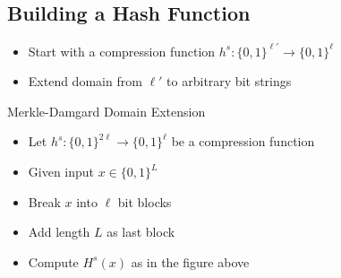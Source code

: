 \subsection*{Building a Hash Function}
\begin{itemize}
    \item Start with a compression function $h^s:\{0,1\}^{\ell'}\rightarrow \{0,1\}^{\ell}$
    \item Extend domain from $\ell'$ to arbitrary bit strings
\end{itemize}

Merkle-Damgard Domain Extension
\begin{itemize}
    \item Let $h^s:\{0,1\}^{2\ell}\rightarrow \{0,1\}^{\ell}$ be 
    a compression function
    \item Given input $x\in\{0,1\}^L$
    \item Break $x$ into $\ell$ bit blocks
    \item Add length $L$ as last block
    \item Compute $H^s(x)$ as in the figure above
\end{itemize}